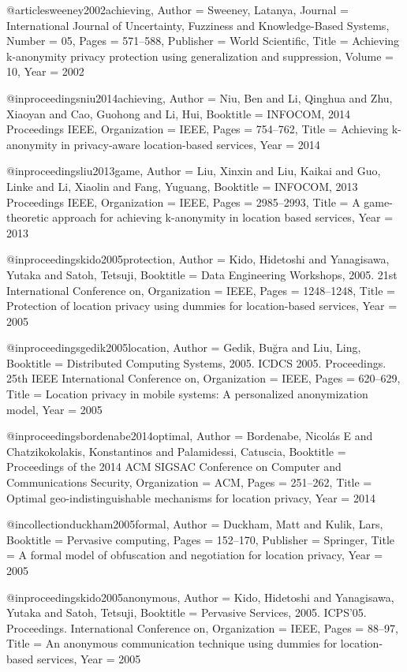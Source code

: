 {{{{{{{{{@article{sweeney2002achieving,
	Author = {Sweeney, Latanya},
	Journal = {International Journal of Uncertainty, Fuzziness and Knowledge-Based Systems},
	Number = {05},
	Pages = {571--588},
	Publisher = {World Scientific},
	Title = {Achieving k-anonymity privacy protection using generalization and suppression},
	Volume = {10},
	Year = {2002}}

@inproceedings{niu2014achieving,
	Author = {Niu, Ben and Li, Qinghua and Zhu, Xiaoyan and Cao, Guohong and Li, Hui},
	Booktitle = {INFOCOM, 2014 Proceedings IEEE},
	Organization = {IEEE},
	Pages = {754--762},
	Title = {Achieving k-anonymity in privacy-aware location-based services},
	Year = {2014}}

@inproceedings{liu2013game,
	Author = {Liu, Xinxin and Liu, Kaikai and Guo, Linke and Li, Xiaolin and Fang, Yuguang},
	Booktitle = {INFOCOM, 2013 Proceedings IEEE},
	Organization = {IEEE},
	Pages = {2985--2993},
	Title = {A game-theoretic approach for achieving k-anonymity in location based services},
	Year = {2013}}

@inproceedings{kido2005protection,
	Author = {Kido, Hidetoshi and Yanagisawa, Yutaka and Satoh, Tetsuji},
	Booktitle = {Data Engineering Workshops, 2005. 21st International Conference on},
	Organization = {IEEE},
	Pages = {1248--1248},
	Title = {Protection of location privacy using dummies for location-based services},
	Year = {2005}}

@inproceedings{gedik2005location,
	Author = {Gedik, Bu{\u{g}}ra and Liu, Ling},
	Booktitle = {Distributed Computing Systems, 2005. ICDCS 2005. Proceedings. 25th IEEE International Conference on},
	Organization = {IEEE},
	Pages = {620--629},
	Title = {Location privacy in mobile systems: A personalized anonymization model},
	Year = {2005}}

@inproceedings{bordenabe2014optimal,
	Author = {Bordenabe, Nicol{\'a}s E and Chatzikokolakis, Konstantinos and Palamidessi, Catuscia},
	Booktitle = {Proceedings of the 2014 ACM SIGSAC Conference on Computer and Communications Security},
	Organization = {ACM},
	Pages = {251--262},
	Title = {Optimal geo-indistinguishable mechanisms for location privacy},
	Year = {2014}}

@incollection{duckham2005formal,
	Author = {Duckham, Matt and Kulik, Lars},
	Booktitle = {Pervasive computing},
	Pages = {152--170},
	Publisher = {Springer},
	Title = {A formal model of obfuscation and negotiation for location privacy},
	Year = {2005}}

@inproceedings{kido2005anonymous,
	Author = {Kido, Hidetoshi and Yanagisawa, Yutaka and Satoh, Tetsuji},
	Booktitle = {Pervasive Services, 2005. ICPS'05. Proceedings. International Conference on},
	Organization = {IEEE},
	Pages = {88--97},
	Title = {An anonymous communication technique using dummies for location-based services},
	Year = {2005}}

}}}}}}}}}
